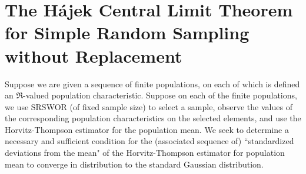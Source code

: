 

\section{The H\'ajek Central Limit Theorem for Simple Random Sampling without Replacement}
\setcounter{theorem}{0}
\setcounter{equation}{0}

Suppose we are given a sequence of finite populations, on each of which is defined an $\Re$-valued population characteristic.
Suppose on each of the finite populations, we use SRSWOR (of fixed sample size) to select a sample, observe the values
of the corresponding population characteristics on the selected elements,
and use the Horvitz-Thompson estimator for the population mean.
We seek to determine a necessary and sufficient condition for the (associated sequence of)
``standardized deviations from the mean" of the Horvitz-Thompson estimator for population mean
to converge in distribution to the standard Gaussian distribution.


